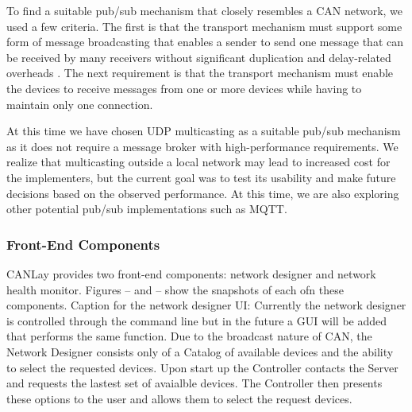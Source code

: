 \documentclass[letterpaper,twocolumn,12pt]{article}
\begin{document}
To find a suitable pub/sub mechanism that closely resembles a CAN network, we used a few criteria. The first is that the transport mechanism must support some form of message broadcasting that enables a sender to send one message that can be received by many receivers without significant duplication and delay-related overheads \cite{kaiser_implementing_1999}. The next requirement is that the transport mechanism must enable the devices to receive messages from one or more devices while having to maintain only one connection.

At this time we have chosen UDP multicasting as a suitable pub/sub mechanism as it does not require a message broker with high-performance requirements. We realize that multicasting outside a local network may lead to increased cost for the implementers, but the current goal was to test its usability and make future decisions based on the observed performance. At this time, we are also exploring other potential pub/sub implementations such as MQTT.


\subsubsection{Front-End Components}
CANLay provides two front-end components: network designer and network health monitor. Figures -- and -- show the snapshots of each ofn these components. 
Caption for the network designer UI: Currently the network designer is controlled through the command line but in the future a GUI will be added that performs the same function.
Due to the broadcast nature of CAN, the Network Designer consists only of a Catalog of available devices and the ability to select the requested devices. Upon start up the Controller contacts the Server and requests the lastest set of avaialble devices. The Controller then presents these options to the user and allows them to select the request devices.
\end{document}
